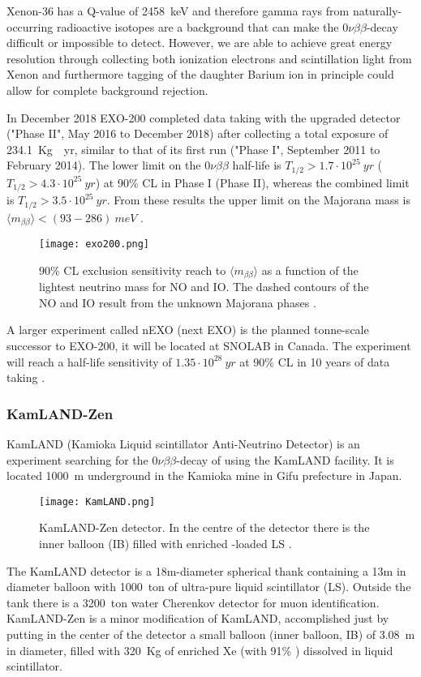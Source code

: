 \documentclass{subnucbo}
\begin{document}
Xenon-36 has a Q-value of \SI{2458}{keV} and therefore gamma rays from naturally-occurring radioactive isotopes are a background that can make the $0\nu\beta\beta$-decay difficult or impossible to detect.
However, we are able to achieve great energy resolution through collecting both ionization electrons and scintillation light from Xenon and furthermore tagging of the daughter Barium ion in principle could allow for complete background rejection.

In December 2018 EXO-200 completed data taking with the upgraded detector ("Phase II", May 2016 to December 2018) after collecting a total exposure of \SI{234.1}{Kg\cdot yr}, similar to that of its first run ("Phase I", September 2011 to February 2014).
The lower limit on the  $0\nu\beta\beta$ half-life is $T_{1/2}>1.7\cdot10^{25}\SI{}{yr}$ ($T_{1/2}>4.3\cdot10^{25}\SI{}{yr}$) at 90\% CL in Phase I (Phase II), whereas the combined limit is $T_{1/2}>3.5\cdot10^{25}\SI{}{yr}$. From these results the upper limit on the Majorana mass is $\langle m_{\beta\beta}\rangle<(93-286)\SI{}{meV}$ \cite{ref:exo}.

\begin{figure}[h]
\centering
\texttt{[image: exo200.png]}
\caption{90\% CL exclusion sensitivity reach to $\langle m_{\beta\beta}\rangle$ as a function of the lightest neutrino mass for NO and IO. The dashed contours of the NO and IO result from the unknown Majorana phases \cite{ref:nexo}.}
\end{figure}

A larger experiment called nEXO (next EXO) is the planned tonne-scale successor to EXO-200, it will be located at SNOLAB in Canada.
The experiment will reach a half-life sensitivity of $1.35\cdot10^{28}\SI{}{yr}$ at 90\% CL in 10 years of data taking \cite{ref:nexo}.

\subsubsection{KamLAND-Zen}
KamLAND (Kamioka Liquid scintillator Anti-Neutrino Detector) is an experiment searching for the $0\nu\beta\beta$-decay of  using the KamLAND facility. It is located \SI{1000}{m} underground in the Kamioka mine in Gifu prefecture in Japan.
\begin{figure}
\centering
\texttt{[image: KamLAND.png]}
\caption{KamLAND-Zen detector. In the centre of the detector there is the inner balloon (IB) filled with enriched -loaded LS \cite{ref:kam}.}
\label{fig:kamDet}
\end{figure}
The KamLAND detector is a 18m-diameter spherical thank containing a 13m in diameter balloon with \SI{1000}{ton} of ultra-pure liquid scintillator (LS). Outside the tank there is a \SI{3200}{ton} water Cherenkov detector for muon identification.
KamLAND-Zen is a minor modification of KamLAND, accomplished just by putting in the center of the detector a small balloon (inner balloon, IB) of \SI{3.08}{m} in diameter, filled with \SI{320}{Kg} of enriched Xe (with 91\% ) dissolved in liquid scintillator.
\end{document}
